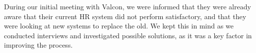 During our initial meeting with Valcon, we were informed that they were already aware that their current HR system did not perform satisfactory, and that they were looking at new systems to replace the old. We kept this in mind as we conducted interviews and investigated possible solutions, as it was a key factor in improving the process.